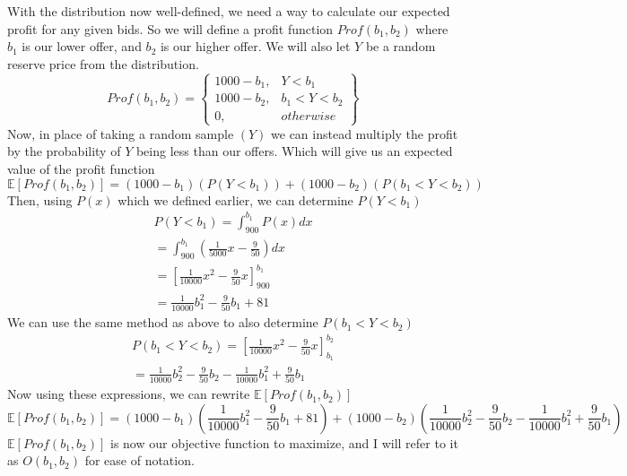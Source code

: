\documentclass{article}
\begin{document}
With the distribution now well-defined, we need a way to calculate our expected profit for any given
bids.
So we will define a profit function $Prof(b_1, b_2)$ where $b_1$ is our lower offer, and $b_2$ is our
higher offer. We will also let $Y$ be a random reserve price from the distribution.
\begin{equation}
    Prof(b_1, b_2) = 
    \left\{
        \begin{array}{lr}
            1000 - b_1, & Y < b_1 \\
            1000 - b_2, & b_1 < Y < b_2 \\
            0, & otherwise
        \end{array}
    \right\}
\end{equation}
Now, in place of taking a random sample $(Y)$ we can instead multiply the profit by the probability of $Y$ being less
than our offers.
Which will give us an expected value of the profit function
\begin{equation}
    \mathbb{E}[Prof(b_1, b_2)] = (1000 - b_1)(P(Y < b_1)) + (1000 - b_2)(P(b_1 < Y < b_2))
\end{equation}
Then, using $P(x)$ which we defined earlier, we can determine $P(Y < b_1)$
\begin{gather}
    P(Y < b_1) = \int_{900}^{b_1}P(x)dx \\
    = \int_{900}^{b_1}(\frac{1}{5000}x-\frac{9}{50})dx \\
    = \left[
        \frac{1}{10000}x^2 - \frac{9}{50}x
    \right]_{900}^{b_1} \\
    = \frac{1}{10000}b_1^2 - \frac{9}{50}b_1 + 81
\end{gather}
We can use the same method as above to also determine $P(b_1 < Y < b_2)$
\begin{gather}
    P(b_1 < Y < b_2)
    = \left[
        \frac{1}{10000}x^2 - \frac{9}{50}x
    \right]_{b_1}^{b_2} \\
    = \frac{1}{10000}b_2^2 - \frac{9}{50}b_2 - \frac{1}{10000}b_1^2
    + \frac{9}{50}b_1
\end{gather}
Now using these expressions, we can rewrite $\mathbb{E}[Prof(b_1, b_2)]$
\begin{dmath}
    \mathbb{E}[Prof(b_1, b_2)] = (1000 - b_1)\left(\frac{1}{10000}b_1^2 - \frac{9}{50}b_1 + 81\right)
    + (1000 - b_2)\left(\frac{1}{10000}b_2^2 - \frac{9}{50}b_2 - \frac{1}{10000}b_1^2 + \frac{9}{50}b_1\right)
\end{dmath}
$\mathbb{E}[Prof(b_1, b_2)]$ is now our objective function to maximize, and I will refer to it as $O(b_1, b_2)$
for ease of notation.
\end{document}
